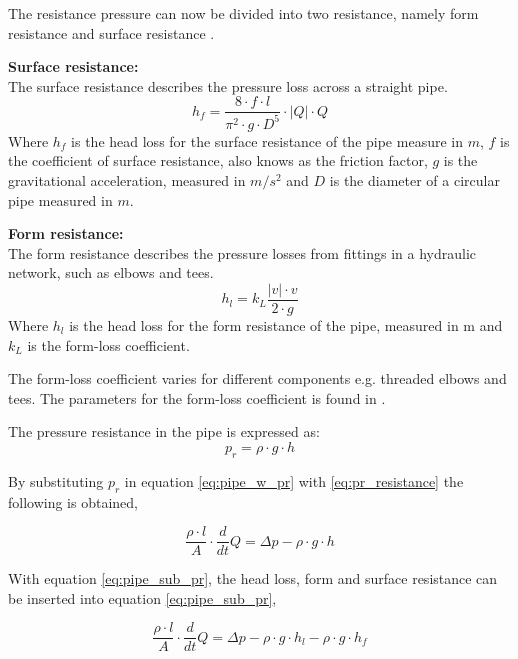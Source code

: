 The resistance pressure can now be divided into two resistance, namely form resistance and surface resistance \cite{swamee_pipe}. 

\textbf{Surface resistance:}\\
The surface resistance describes the pressure loss across a straight pipe.
\begin{equation}\label{eq:surface_resistance}
h_f=\frac{8\cdot f\cdot l}{\pi^2\cdot g\cdot D^5} \cdot |Q|\cdot Q
\end{equation}
Where $h_f$ is the head loss for the surface resistance of the pipe measure in $m$, $f$ is the coefficient of surface resistance, also knows as the friction factor, $g$ is the gravitational acceleration, measured in $m/s^2$ and $D$ is the diameter of a circular pipe measured in $m$.

\textbf{Form resistance:}\\
The form resistance describes the pressure losses from fittings in a hydraulic network, such as elbows and tees. 
\begin{equation} \label{eq:form_resistance}
h_l=k_L \frac{ |v|\cdot v }{2\cdot g}
\end{equation}
Where $h_l$ is the head loss for the form resistance of the pipe, measured in m  and $k_L$ is the form-loss coefficient.

The form-loss coefficient varies for different components e.g. threaded elbows and tees. The parameters for the form-loss coefficient is found in \cite{fundamentals_of_fluid_mechanics}. 

The pressure resistance in the pipe is expressed as:
\begin{equation}\label{eq:pr_resistance}
p_r=\rho \cdot g \cdot h 
\end{equation}

By substituting $p_r$ in equation \ref{eq:pipe_w_pr} with \ref{eq:pr_resistance} the following is obtained,

\begin{equation} \label{eq:pipe_sub_pr}
\frac{\rho \cdot l}{A}\cdot \frac{d}{dt}Q = \Delta p - \rho \cdot g \cdot h 
\end{equation}

With equation \ref{eq:pipe_sub_pr}, the head loss, form and surface resistance can be inserted into equation \ref{eq:pipe_sub_pr},

\begin{equation} \label{eq:pipe_sub_pr_2}
\frac{\rho \cdot l}{A}\cdot \frac{d}{dt}Q = \Delta p - \rho \cdot g \cdot h_l - \rho \cdot g \cdot h_f
\end{equation}

